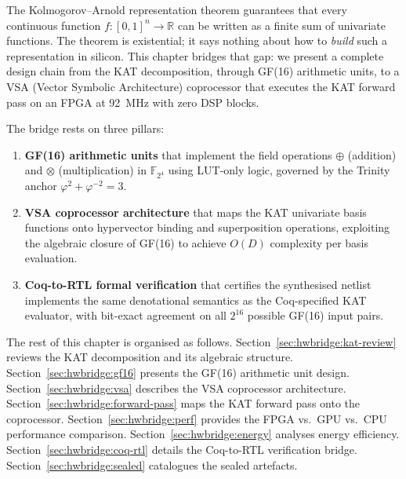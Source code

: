 The Kolmogorov--Arnold representation theorem guarantees that every continuous
function $f\colon [0,1]^n \to \mathbb{R}$ can be written as a finite sum
of univariate functions. The theorem is existential; it says nothing about
how to \emph{build} such a representation in silicon. This chapter bridges
that gap: we present a complete design chain from the KAT decomposition,
through GF(16) arithmetic units, to a VSA (Vector Symbolic Architecture)
coprocessor that executes the KAT forward pass on an FPGA at 92~MHz with
zero DSP blocks.

The bridge rests on three pillars:

\begin{enumerate}
  \item \textbf{GF(16) arithmetic units} that implement the field operations
        $\oplus$ (addition) and $\otimes$ (multiplication) in $\mathbb{F}_{2^4}$
        using LUT-only logic, governed by the Trinity anchor
        $\varphi^2 + \varphi^{-2} = 3$.
  \item \textbf{VSA coprocessor architecture} that maps the KAT univariate
        basis functions onto hypervector binding and superposition operations,
        exploiting the algebraic closure of GF(16) to achieve
        $O(D)$ complexity per basis evaluation.
  \item \textbf{Coq-to-RTL formal verification} that certifies the synthesised
        netlist implements the same denotational semantics as the Coq-specified
        KAT evaluator, with bit-exact agreement on all $2^{16}$ possible
        GF(16) input pairs.
\end{enumerate}

The rest of this chapter is organised as follows.
Section~\ref{sec:hwbridge:kat-review} reviews the KAT decomposition and its
algebraic structure. Section~\ref{sec:hwbridge:gf16} presents the GF(16)
arithmetic unit design. Section~\ref{sec:hwbridge:vsa} describes the VSA
coprocessor architecture. Section~\ref{sec:hwbridge:forward-pass} maps the
KAT forward pass onto the coprocessor. Section~\ref{sec:hwbridge:perf}
provides the FPGA vs.\ GPU vs.\ CPU performance comparison.
Section~\ref{sec:hwbridge:energy} analyses energy efficiency.
Section~\ref{sec:hwbridge:coq-rtl} details the Coq-to-RTL verification bridge.
Section~\ref{sec:hwbridge:sealed} catalogues the sealed artefacts.



